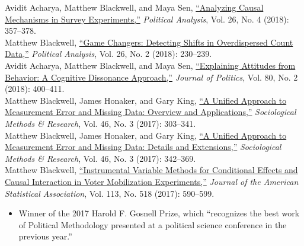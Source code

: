 \documentclass[margin,line,12pt]{res}
\begin{document}
\begin{resume}
Avidit Acharya, Matthew Blackwell, and Maya Sen, \href{http://www.mattblackwell.org/files/papers/survey-experiments.pdf}{``Analyzing Causal Mechanisms in Survey Experiments,''} \emph{Political Analysis}, Vol. 26, No. 4 (2018): 357--378.\vspace{1em}\\
Matthew Blackwell, \href{http://www.mattblackwell.org/files/papers/gamechangers-letter.pdf}{``Game Changers: Detecting Shifts in Overdispersed Count Data,''} \emph{Political Analysis}, Vol. 26, No. 2 (2018): 230--239.\vspace{1em}\\
Avidit Acharya, Matthew Blackwell, and Maya Sen, \href{http://www.mattblackwell.org/files/papers/attitudes.pdf}{``Explaining Attitudes from Behavior: A Cognitive Dissonance Approach,''} \emph{Journal of Politics}, Vol. 80, No. 2 (2018): 400--411.\vspace{1em}\\
Matthew Blackwell, James Honaker, and Gary King, \href{http://gking.harvard.edu/files/measure.pdf}{``A Unified Approach to Measurement Error and
Missing Data: Overview and Applications,''} \emph{Sociological Methods \& Research}, Vol. 46, No. 3 (2017): 303--341.\vspace{1em}\\
Matthew Blackwell, James Honaker, and Gary King, \href{http://gking.harvard.edu/files/measured.pdf}{``A Unified Approach to Measurement Error and
  Missing Data: Details and Extensions,''} \emph{Sociological Methods \& Research}, Vol. 46, No. 3 (2017): 342--369.\vspace{1em}\\
Matthew Blackwell, \href{http://www.mattblackwell.org/files/papers/joint-iv.pdf}{``Instrumental Variable Methods for Conditional Effects and Causal Interaction in Voter Mobilization Experiments,''} \emph{Journal of the American Statistical Association}, Vol. 113, No. 518 (2017): 590--599. 
\begin{itemize} 
\item Winner of the 2017 Harold F. Gosnell Prize, which ``recognizes the best work of Political Methodology presented at a political science conference in the previous year.''
\end{itemize}


\end{resume}
\end{document}
